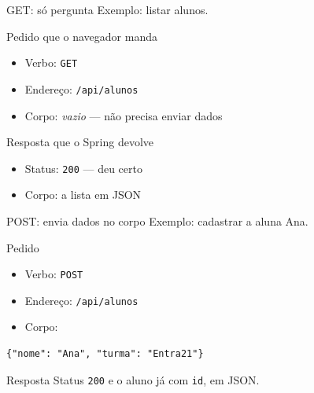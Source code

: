 \documentclass[aspectratio=169,11pt]{beamer}
\begin{document}
\begin{frame}{GET: só pergunta}
  Exemplo: listar alunos.

  \vspace{0.5em}
  \begin{block}{Pedido que o navegador manda}
    \begin{itemize}
      \item Verbo: \texttt{GET}
      \item Endereço: \texttt{/api/alunos}
      \item Corpo: \textit{vazio} --- não precisa enviar dados
    \end{itemize}
  \end{block}

  \vspace{0.3em}
  \begin{block}{Resposta que o Spring devolve}
    \begin{itemize}
      \item Status: \texttt{200} --- deu certo
      \item Corpo: a lista em JSON
    \end{itemize}
  \end{block}
\end{frame}

\begin{frame}[fragile]{POST: envia dados no corpo}
  Exemplo: cadastrar a aluna Ana.

  \vspace{0.3em}
  \begin{block}{Pedido}
    \begin{itemize}
      \item Verbo: \texttt{POST}
      \item Endereço: \texttt{/api/alunos}
      \item Corpo:
    \end{itemize}
\begin{lstlisting}[basicstyle=\ttfamily\footnotesize]
{"nome": "Ana", "turma": "Entra21"}
\end{lstlisting}
  \end{block}

  \vspace{0.2em}
  \begin{block}{Resposta}
    Status \texttt{200} e o aluno já com \texttt{id}, em JSON.
  \end{block}
\end{frame}
\end{document}
